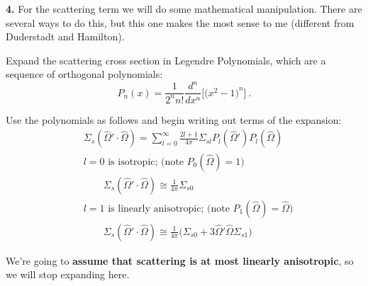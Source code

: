 \documentclass[12pt]{article}
\newcommand{\vOmega}{\ensuremath{\hat{\Omega}}}
\begin{document}

%
%

\textbf{4.} For the scattering term we will do some mathematical manipulation. There are several ways to do this, but this one makes the most sense to me (different from Duderstadt and Hamilton).

Expand the scattering cross section in Legendre Polynomials, which are a sequence of orthogonal polynomials:
%
\[P_n(x) = \frac{1}{2^n n!}\frac{d^n}{dx^n} \bigl[\bigl( x^2 -1 \bigr)^n\bigr] \:.\]

Use the polynomials as follows and begin writing out terms of the expansion:
\begin{align*}
&\Sigma_s(\vOmega' \cdot \vOmega) = \sum_{l=0}^{\infty} \frac{2l+1}{4\pi} \Sigma_{sl} P_l(\vOmega')P_l(\vOmega) \\
%
&l=0 \text{ is isotropic; (note } P_0 (\vOmega) = 1 \text{)}\\
&\qquad \Sigma_s(\vOmega' \cdot \vOmega) \cong \frac{1}{4\pi}\Sigma_{s0} \\
%
&l=1 \text{ is linearly anisotropic; (note } P_1 (\vOmega) = \vOmega \text{)}\\
&\qquad \Sigma_s(\vOmega' \cdot \vOmega) \cong \frac{1}{4\pi}\bigl( \Sigma_{s0} + 3\vOmega' \vOmega \Sigma_{s1} \bigr) 
\end{align*}

We're going to \textbf{assume that scattering is at most linearly anisotropic}, so we will stop expanding here.
\end{document}
